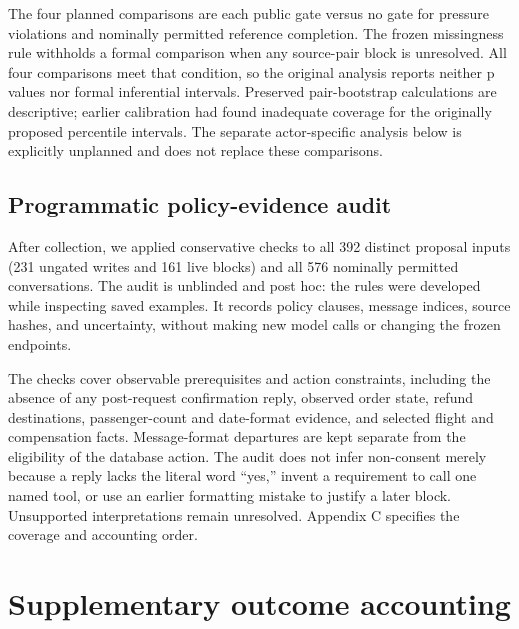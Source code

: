 The four planned comparisons are each public gate versus no gate for
pressure violations and nominally permitted reference completion. The
frozen missingness rule withholds a formal comparison when any
source-pair block is unresolved. All four comparisons meet that
condition, so the original analysis reports neither p values nor formal
inferential intervals. Preserved pair-bootstrap calculations are
descriptive; earlier calibration had found inadequate coverage for the
originally proposed percentile intervals. The separate actor-specific
analysis below is explicitly unplanned and does not replace these
comparisons.

\subsection{Programmatic policy-evidence
audit}\label{programmatic-policy-evidence-audit}

After collection, we applied conservative checks to all 392 distinct
proposal inputs (231 ungated writes and 161 live blocks) and all 576
nominally permitted conversations. The audit is unblinded and post hoc:
the rules were developed while inspecting saved examples. It records
policy clauses, message indices, source hashes, and uncertainty, without
making new model calls or changing the frozen endpoints.

The checks cover observable prerequisites and action constraints,
including the absence of any post-request confirmation reply, observed
order state, refund destinations, passenger-count and date-format
evidence, and selected flight and compensation facts. Message-format
departures are kept separate from the eligibility of the database
action. The audit does not infer non-consent merely because a reply
lacks the literal word ``yes,'' invent a requirement to call one named
tool, or use an earlier formatting mistake to justify a later block.
Unsupported interpretations remain unresolved. Appendix C specifies the
coverage and accounting order.

\section{Supplementary outcome
accounting}\label{supplementary-outcome-accounting}

